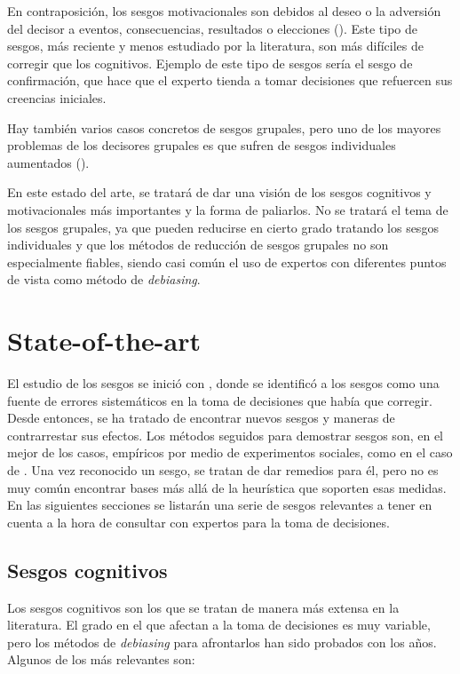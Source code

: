 \documentclass[a4paper,11pt]{article}
\begin{document}
En contraposición, los sesgos motivacionales son debidos al deseo o la adversión del decisor a eventos, consecuencias, resultados o elecciones (\cite{kunda1990}). Este tipo de sesgos, más reciente y menos estudiado por la literatura, son más difíciles de corregir que los cognitivos. Ejemplo de este tipo de sesgos sería el sesgo de confirmación, que hace que el experto tienda a tomar decisiones que refuercen sus creencias iniciales.

Hay también varios casos concretos de sesgos grupales, pero uno de los mayores problemas de los decisores grupales es que sufren de sesgos individuales aumentados (\cite{kerr2004}).

En este estado del arte, se tratará de dar una visión de los sesgos cognitivos y motivacionales más importantes y la forma de paliarlos. No se tratará el tema de los sesgos grupales, ya que pueden reducirse en cierto grado tratando los sesgos individuales y que los métodos de reducción de sesgos grupales no son especialmente fiables, siendo casi común el uso de expertos con diferentes puntos de vista como método de \textit{debiasing}.


\section{State-of-the-art}
El estudio de los sesgos se inició con \cite{tversky1974}, donde se identificó a los sesgos como una fuente de errores sistemáticos en la toma de decisiones que había que corregir. Desde entonces, se ha tratado de encontrar nuevos sesgos y maneras de contrarrestar sus efectos. Los métodos seguidos para demostrar sesgos son, en el mejor de los casos, empíricos por medio de experimentos sociales, como en el caso de \cite{moore2008}. Una vez reconocido un sesgo, se tratan de dar remedios para él, pero no es muy común encontrar bases más allá de la heurística que soporten esas medidas. En las siguientes secciones se listarán una serie de sesgos relevantes a tener en cuenta a la hora de consultar con expertos para la toma de decisiones.

\subsection{Sesgos cognitivos}
Los sesgos cognitivos son los que se tratan de manera más extensa en la literatura. El grado en el que afectan a la toma de decisiones es muy variable, pero los métodos de \textit{debiasing} para afrontarlos han sido probados con los años. Algunos de los más relevantes son:
\end{document}
